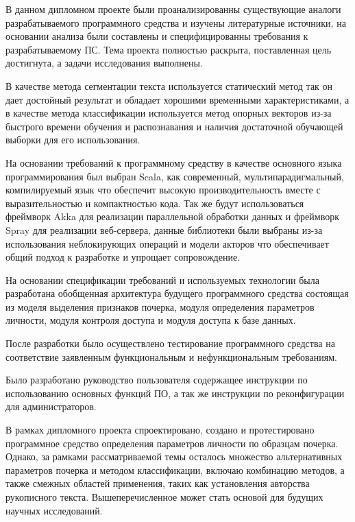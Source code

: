 \label{sec:outro}

В данном дипломном проекте были проанализированны существующие аналоги разрабатываемого программного средства и изучены литературные источники, на основании анализа были составлены и специфицированны требования к разрабатываемому ПС. Тема проекта полностью раскрыта, поставленная цель достигнута, а задачи исследования выполнены.

В качестве метода сегментации текста используется статический метод так он дает достойный результат и обладает хорошими временными характеристиками, а в качестве метода классификации используется метод опорных векторов из-за быстрого времени обучения и распознавания и наличия достаточной обучающей выборки для его использования.

На основании требований к программному средству в качестве основного языка программирования был выбран Scala, как современный, мультипарадигмальный, компилируемый язык что обеспечит высокую производительность вместе с выразительностью и компактностью кода. Так же будут использоваться фреймворк Akka для реализации параллельной обработки данных и фреймворк Spray для реализации веб-сервера, данные библиотеки были выбраны из-за использования неблокирующих операций и модели акторов что обеспечивает общий подход к разработке и упрощает сопровождение.

На основании спецификации требований и используемых технологии была разработана обобщенная архитектура будущего программного средства состоящая из моделя выделения признаков почерка, модуля определения параметров личности, модуля контроля доступа и модуля доступа к базе данных.

После разработки было осуществлено тестирование программного средства на соответствие заявленным функциональным и нефункциональным требованиям.

Было разработано руководство пользователя содержащее инструкции по использованию основных функций ПО, а так же инструкции по реконфигурации для администраторов.

В рамках дипломного проекта спроектировано, создано и протестировано программное средство определения параметров личности по образцам почерка. Однако, за рамками рассматриваемой темы осталось множество альтернативных параметров почерка и методом классификации, включаю комбинацию методов, а также смежных областей применения, таких как установления авторства рукописного текста. Вышеперечисленное может стать основой для будущих научных исследований.